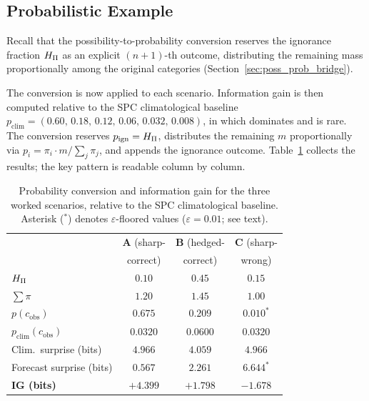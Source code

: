 \subsection{Probabilistic Example}\label{sec:bridge_walkthrough}

Recall that the possibility-to-probability conversion reserves the
ignorance fraction $H_{\Pi}$ as an explicit $(n{+}1)$-th outcome,
distributing the remaining mass proportionally among the original
categories (Section~\ref{sec:poss_prob_bridge}).

The conversion is now applied to each scenario. Information gain is then
computed relative to the SPC climatological baseline
$p_{\mathrm{clim}} = (0.60,\, 0.18,\, 0.12,\, 0.06,\, 0.032,\,
0.008)$, in which  dominates and  is rare.
The conversion reserves $p_{\mathrm{ign}} = H_{\Pi}$, distributes
the remaining $m$ proportionally via
$p_i = \pi_i \cdot m / \sum_j \pi_j$,
and appends the ignorance outcome.
Table~\ref{tab:bridge_ils} collects the results; the key pattern is
readable column by column.

\begin{table}[htbp]
\centering
\caption{Probability conversion and information gain for the three worked
    scenarios, relative to the SPC climatological baseline.
    Asterisk ($^*$) denotes $\varepsilon$-floored values
    ($\varepsilon = 0.01$; see text).}
\label{tab:bridge_ils}
\footnotesize
\setlength{\tabcolsep}{4pt}
\begin{tabular}{lccc}
\toprule
 & \textbf{A} (sharp- & \textbf{B} (hedged- & \textbf{C} (sharp- \\
 & correct) & correct) & wrong) \\
\midrule
$H_{\Pi}$ & $0.10$ & $0.45$ & $0.15$ \\
$\sum \pi$ & $1.20$ & $1.45$ & $1.00$ \\
$p(c_{\mathrm{obs}})$ & $0.675$ & $0.209$ & $0.010^*$ \\
$p_{\mathrm{clim}}(c_{\mathrm{obs}})$ & $0.0320$ & $0.0600$ & $0.0320$ \\
Clim.\ surprise (bits) & $4.966$ & $4.059$ & $4.966$ \\
Forecast surprise (bits) & $0.567$ & $2.261$ & $6.644^*$ \\
\textbf{IG (bits)} & $\mathbf{+4.399}$ & $\mathbf{+1.798}$ & $\mathbf{-1.678}$ \\
\bottomrule
\end{tabular}
\end{table}

